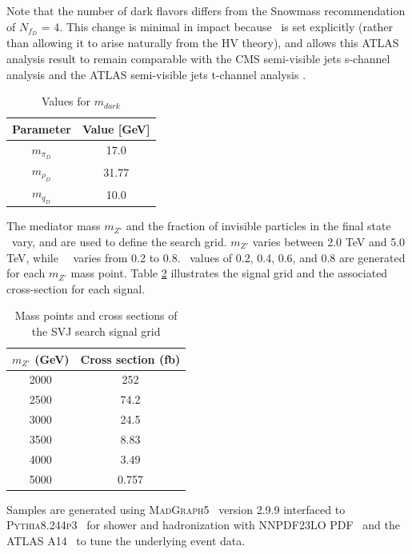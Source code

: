 Note that the number of dark flavors differs from the Snowmass recommendation of $N_{f_D}$ = 4. 
This change is minimal in impact because \rinv~is set explicitly (rather than allowing it to arise naturally from the HV theory), and allows this ATLAS analysis result to remain comparable with the CMS semi-visible jets s-channel analysis \cite{cms_svj} and the ATLAS semi-visible jets t-channel analysis \cite{tchannel}. \par

\begin{table}
\centering
  \begin{tabular}{ |c|c| }
    \hline
    Parameter & Value [GeV] \\
    \hline
     $m_{\pi_D}$ & 17.0 \\
     $m_{\rho_D}$ & 31.77 \\ 
     $m_{q_D}$ & 10.0 \\ 
    \hline
  \end{tabular}
  \caption{Values for $m_{dark}$}
  \label{tab:model_mdark}
\end{table}

The mediator mass $m_{Z'}$ and the fraction of invisible particles in the final state \rinv~vary, and are used to define the search grid. $m_{Z'}$ varies between 2.0 TeV and 5.0 TeV, while~\rinv~ varies from 0.2 to 0.8. \rinv~values of 0.2, 0.4, 0.6, and 0.8 are generated for each $m_{Z'}$ mass point. Table \ref{tab:sig_grid} illustrates the signal grid and the associated cross-section for each signal.

\begin{table}
\centering
  \begin{tabular}{ |c|c| }
    \hline
    $m_{Z'}$ (GeV) & Cross section (fb)  \\
    \hline
     2000 &  252 \\
     2500 &  74.2 \\
     3000 &  24.5\\ 
     3500 &  8.83\\
     4000 &  3.49 \\ 
     5000 &  0.757 \\
    \hline
  \end{tabular}
  \caption{Mass points and cross sections of the SVJ search signal grid}
  \label{tab:sig_grid}
\end{table}

Samples are generated using 
\textsc{MadGraph5}~\cite{Alwall:2014hca} version 2.9.9 interfaced to 
\textsc{Pythia8.244p3}~\cite{pythia} for shower and hadronization with 
NNPDF23LO PDF~\cite{Butterworth:2015oua} and the 
ATLAS A14~\cite{Skands:2014pea} to tune the underlying event data.
